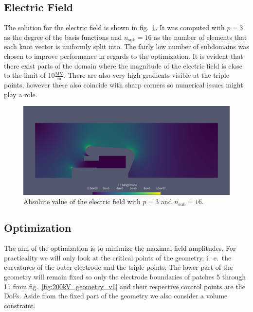 \subsection{Electric Field}
The solution for the electric field is shown in fig.~\ref{fig:200kV_electric_field}.
It was computed with $p=3$ as the degree of the basis functions and $n_\mathrm{sub}=16$ as the number of elements that each knot vector is uniformly split into. The fairly low number of subdomains was chosen to improve performance in regards to the optimization.
It is evident that there exist parts of the domain where the magnitude of the electric field is close to the limit of $10 \frac{\mathrm{MV}}{\mathrm{m}}$. There are also very high gradients visible at the triple points, however these also coincide with sharp corners so numerical issues might play a role.

\begin{center}
\begin{figure}[H]
  \includegraphics[width=\textwidth]{figures/200kV/png/order=3}
  \caption{Absolute value of the electric field with $p=3$ and $n_\mathrm{sub}=16$.}
  \label{fig:200kV_electric_field}
\end{figure}
\end{center}

\subsection{Optimization}
The aim of the optimization is to minimize the maximal field amplitudes. For practicality we will only look at the critical points of the geometry, i.~e.~the curvatures of the outer electrode and the triple points. The lower part of the geometry will remain fixed so only the electrode boundaries of patches 5 through 11 from fig.~\ref{fig:200kV_geometry_v1} and their respective control points are the DoFs. Aside from the fixed part of the geometry we also consider a volume constraint.

